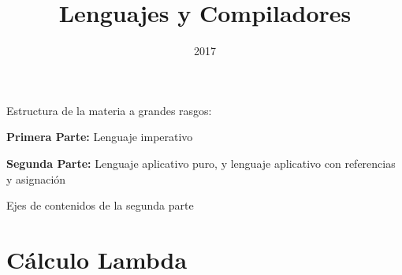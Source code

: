 \documentclass[handout]{beamer}
\title{Lenguajes y Compiladores}
\date{2017}
\begin{document}
\begin{frame}
  \titlepage
\end{frame}


\begin{frame}{Estructura de la materia a grandes rasgos:}

\textbf{Primera Parte: } Lenguaje imperativo

\bigskip


\textbf{Segunda Parte: } Lenguaje aplicativo puro, y lenguaje aplicativo con referencias y asignación

\end{frame}

\begin{frame}{Ejes de contenidos de la segunda parte}
  \tableofcontents
\end{frame}

\section{Cálculo Lambda}













\end{document}
